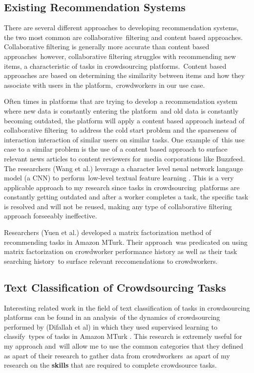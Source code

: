 \documentclass[letterpaper,12pt]{article}
\begin{document}
\subsection{Existing Recommendation Systems}
There are several different approaches to developing recommendation systems, the two most common are collaborative\
filtering and content based approaches. Collaborative filtering is generally more accurate than content based approaches\
however, collaborative filtering struggles with recommending new items, a characteristic of tasks in crowdsourcing platforms.\
Content based approaches are based on determining the similarity between items and how they associate with users in the platform,\
crowdworkers in our use case.

Often times in platforms that are trying to develop a recommendation system where new data is constantly entering the platform\
and old data is constantly becoming outdated, the platform will apply a content based approach instead of collaborative filtering\
to address the cold start problem and the sparseness of interaction interaction of similar users on similar tasks. One example of\
this use case to a similar problem is the use of a content based approach to surface relevant news articles to content reviewers for\
media corporations like Buzzfeed. The researchers (Wang et al.) leverage a character level neual network langauge model (a CNN) to perform\
low-level textual feature learning \cite{wang2017dynamic}. This is a very applicable approach to my research since tasks in crowdsourcing\
platforms are constantly getting outdated and after a worker completes a task, the specific task is resolved and will not be reused, making
any type of collaborative filtering approach forseeably ineffective.

Researchers (Yuen et al.) developed a matrix factorization method of recommending tasks in Amazon MTurk. Their approach\
was predicated on using matrix factorization on crowdworker performance history as well as their task searching history\
to surface relevant reccomendations to crowdworkers.

\subsection{Text Classification of Crowdsourcing Tasks}
Interesting related work in the field of text classification of tasks in crowdsourcing platforms can be found in an analysis\
of the dynamics of crowdsourcing performed by (Difallah et al) in which they used supervised learning to classify\
types of tasks in Amazon MTurk \cite{difallah2015dynamics}. This research is extremely useful for my approach and\
will allow me to use the common categories that they defined as apart of their research to gather data from crowdworkers\
as apart of my research on the \textbf{skills} that are required to complete crowdsource tasks.
\end{document}
